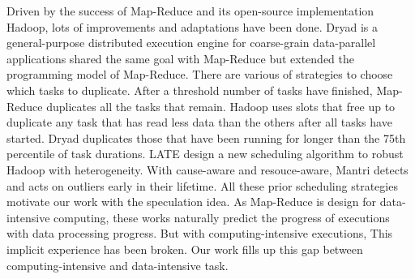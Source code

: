 Driven by the success of Map-Reduce \cite{dean_mapreduce:_2004} and its open-source implementation Hadoop, lots of improvements \cite{zaharia_improving_2008} \cite{ananthanarayanan_reining_2010} and adaptations \cite{mackey_introducing_2008} have been done. Dryad \cite{isard_dryad:_2007} is a general-purpose distributed execution engine for coarse-grain data-parallel applications shared the same goal with Map-Reduce but extended the programming model of Map-Reduce. There are various of strategies to choose which tasks to duplicate. After a threshold number of tasks havefinished, Map-Reduce duplicates all the tasks that remain. Hadoop uses slots that free up to duplicate any task that has read less data than the others after all tasks have started. Dryad duplicates those that have been running for longer than the 75th percentile of task durations. LATE \cite{zaharia_improving_2008} design a new scheduling algorithm to robust Hadoop with heterogeneity. With cause-aware and resouce-aware, Mantri\cite{ananthanarayanan_reining_2010} detects and acts on outliers early in their lifetime. All these prior scheduling strategies motivate our work with the speculation idea. As Map-Reduce is design for data-intensive computing, these works naturally predict the progress of executions with data processing progress. But with computing-intensive executions, This implicit experience has been broken. Our work fills up this gap between computing-intensive and data-intensive task.


